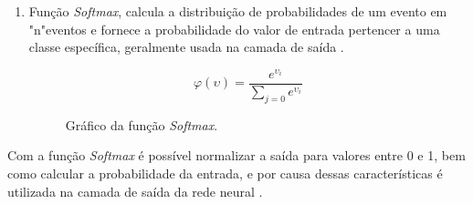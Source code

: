\begin{enumerate}
	\item Função \textit{Softmax}, calcula a distribuição de probabilidades de um evento em "n"\space eventos e fornece a probabilidade do valor de entrada pertencer a uma classe específica, geralmente usada na camada de saída \cite{gharat2019what}.
	\begin{figure}[H]
	\caption{Gráfico da função \textit{Softmax}.}
	\begin{center}
		\begin{minipage}{0.45\textwidth}
			$$\varphi(\upsilon) = \frac{e^{\upsilon_i}}{\sum_{j=0} e^{\upsilon_i}}$$
		\end{minipage}
		\hfill
		\begin{minipage}{0.45\textwidth}
		\end{minipage}
	\end{center}
	\label{fig:grafico_softmax}
	\end{figure}
\end{enumerate}

Com a função \textit{Softmax} é possível normalizar a saída para valores entre 0 e 1, bem como calcular a probabilidade da entrada, e por causa dessas características é utilizada na camada de saída da rede neural \cite{gharat2019what}.
